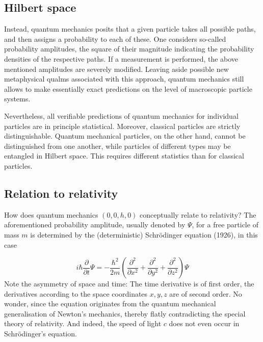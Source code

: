 \subsection*{Hilbert space}

Instead, quantum mechanics posits that a given particle takes all possible paths, and then assigns a probability to each of these. One considers so-called probability amplitudes, the square of their magnitude indicating the probability densities of the respective paths. If a measurement is performed, the above mentioned amplitudes are severely modified. Leaving aside possible new metaphysical qualms associated with this approach, quantum mechanics still allows to make essentially exact predictions on the level of macroscopic particle systems.

Nevertheless, all verifiable predictions of quantum mechanics for individual particles are in principle statistical. Moreover, classical particles are strictly distinguishable. Quantum mechanical particles, on the other hand, cannot be distinguished from one another, while particles of different types may be entangled in Hilbert space. This requires different statistics than for classical particles.


\subsection*{Relation to relativity}

How does quantum mechanics $(0,0,h,0)$ conceptually relate to relativity? The aforementioned probability amplitude, usually denoted by $\Psi$, for a free particle of mass $m$ is determined by the (deterministic) Schrödinger equation (1926), in this case

\begin{equation*}\label{eq:schroedinger}
  i\hbar\frac{\partial}{\partial t}\Psi=-\frac{\hbar^2}{2m}(\frac{\partial^2}{\partial x^2}+\frac{\partial^2}{\partial y^2}+\frac{\partial^2}{\partial z^2})\Psi
\end{equation*}
%
Note the asymmetry of space and time: The time derivative is of first order, the derivatives according to the space coordinates $x,y,z$ are of second order. No wonder, since the equation originates from the quantum mechanical generalisation of Newton's mechanics, thereby flatly contradicting the special theory of relativity. And indeed, the speed of light $c$ does not even occur in Schrödinger's equation.
